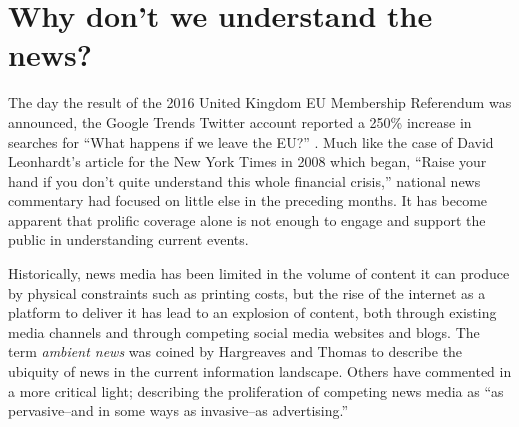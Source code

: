 \section{Why don't we understand the news?}

The day the result of the 2016 United Kingdom EU Membership Referendum was announced, the Google Trends Twitter account reported a 250\% increase in searches for ``What happens if we leave the EU?'' \citep{googletrends}. Much like the case of David Leonhardt's article for the New York Times in 2008 which began, ``Raise your hand if you don't quite understand this whole financial crisis,'' national news commentary had focused on little else in the preceding months. It has become apparent that prolific coverage alone is not enough to engage and support the public in understanding current events.

Historically, news media has been limited in the volume of content it can produce by physical constraints such as printing costs, but the rise of the internet as a platform to deliver it has lead to an explosion of content, both through existing media channels and through competing social media websites and blogs. The term \textit{ambient news} was coined by Hargreaves and Thomas \citep{newnewsoldnews} to describe the ubiquity of news in the current information landscape. Others have commented in a more critical light; describing the proliferation of competing news media as ``as pervasive--and in some ways as invasive--as advertising.'' \citep[p.2]{overloadjournalismsbattle}


